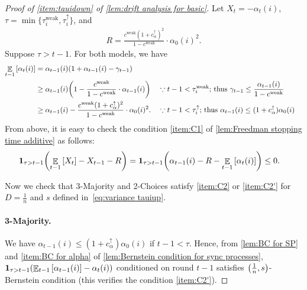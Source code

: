 \documentclass[letterpaper,11pt]{article}
\newcommand{\indicator}{\mathbf{1}}
\DeclareMathOperator*{\E}{\mathbb{E}}
\newcommand{\alphanorm}{\gamma}
\newcommand{\cweak}{c^{\mathrm{weak}}}
\newcommand{\bounded}{D}
\newcommand{\variance}{s}
\newcommand{\tauiup}{\tau^{\uparrow}_i}
\newcommand{\ciup}{c_\alpha^{\uparrow}}
\newcommand{\tauiweak}{\tau^{\mathrm{weak}}_i}
\newcommand{\drift}{R}
\begin{document}
\begin{proof}[Proof of \cref{item:tauidown} of \cref{lem:drift analysis for basic}]
    Let $X_t=-\alpha_t(i)$, $\tau = \min\{\tauiweak,\tauiup\}$, and
      \begin{align*}
       \drift = 
       \frac{\cweak (1+\ciup)^2}{1-\cweak}\cdot\alpha_0(i)^2. %
      \end{align*}
    Suppose $\tau>t-1$.
    For both models, we have
      \begin{align*} 
         \E_{t-1}\qty[ \alpha_t(i) ] &= \alpha_{t-1}(i) \qty( 1 + \alpha_{t-1}(i) - \alphanorm_{t-1} ) \\
         &\ge \alpha_{t-1}(i) \qty( 1 - \frac{\cweak}{1-\cweak}\cdot \alpha_{t-1}(i) ) & & \because\text{$t-1 < \tauiweak$; thus $\alphanorm_{t-1} \le \frac{\alpha_{t-1}(i)}{1-\cweak}$} \\
         &\ge \alpha_{t-1}(i) - \frac{\cweak (1+\ciup)^2}{1-\cweak}\cdot\alpha_0(i)^2. & & \because\text{$t-1 <\tauiup$; thus $\alpha_{t-1}(i) \le (1+\ciup)\alpha_0(i)$}
    \end{align*}
    From above, it is easy to check the condition \ref{item:C1} of \cref{lem:Freedman stopping time additive} as follows:
    \begin{align*}
        \indicator_{\tau>t-1}\qty(\E_{t-1}\qty[ X_t ]-X_{t-1}-R)
        &=\indicator_{\tau>t-1}\qty(\alpha_{t-1}(i)-R-\E_{t-1}\qty[ \alpha_t(i) ])
        \leq 0.
    \end{align*}

    Now we check that 3-Majority and 2-Choices satisfy \ref{item:C2} or \ref{item:C2'} for $\bounded = \frac{1}{n}$ and $\variance$ defined in~\cref{eq:variance tauiup}.


    \paragraph*{3-Majority.}
    We have $\alpha_{t-1}(i) \le (1+\ciup)\alpha_0(i)$ if $ t-1 < \tau $.
    Hence, from \cref{lem:BC for SP} and \cref{item:BC for alpha} of \cref{lem:Bernstein condition for sync processes}, 
    $\indicator_{\tau>t-1}\qty(\E_{t-1}\qty[ \alpha_{t-1}(i)]-\alpha_t(i))$ conditioned on round $t-1$ satisfies $ \qty( \frac{1}{n}, \variance ) $-Bernstein condition (this verifies the condition \ref{item:C2'}).
    

\end{proof}
\end{document}

